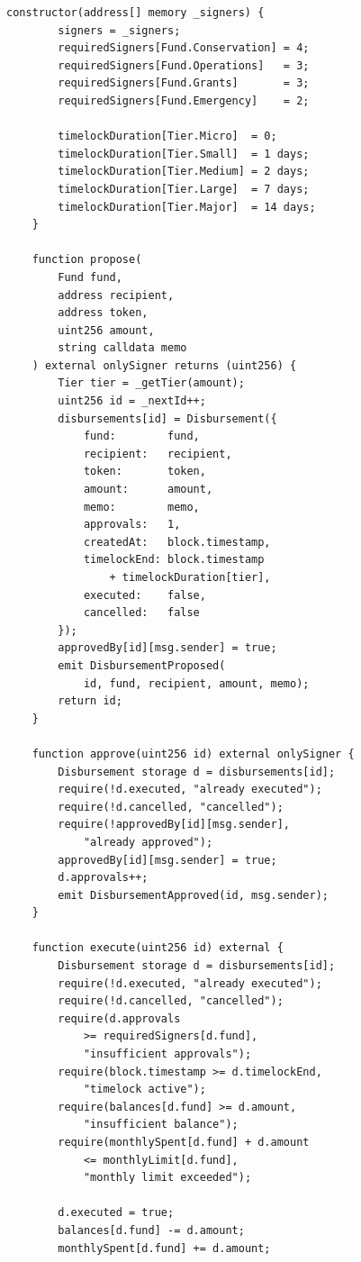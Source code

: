 \documentclass[11pt,letterpaper]{article}
\begin{document}
\begin{lstlisting}[language=Solidity,caption=TreasuryMultisig contract]
    constructor(address[] memory _signers) {
        signers = _signers;
        requiredSigners[Fund.Conservation] = 4;
        requiredSigners[Fund.Operations]   = 3;
        requiredSigners[Fund.Grants]       = 3;
        requiredSigners[Fund.Emergency]    = 2;

        timelockDuration[Tier.Micro]  = 0;
        timelockDuration[Tier.Small]  = 1 days;
        timelockDuration[Tier.Medium] = 2 days;
        timelockDuration[Tier.Large]  = 7 days;
        timelockDuration[Tier.Major]  = 14 days;
    }

    function propose(
        Fund fund,
        address recipient,
        address token,
        uint256 amount,
        string calldata memo
    ) external onlySigner returns (uint256) {
        Tier tier = _getTier(amount);
        uint256 id = _nextId++;
        disbursements[id] = Disbursement({
            fund:        fund,
            recipient:   recipient,
            token:       token,
            amount:      amount,
            memo:        memo,
            approvals:   1,
            createdAt:   block.timestamp,
            timelockEnd: block.timestamp
                + timelockDuration[tier],
            executed:    false,
            cancelled:   false
        });
        approvedBy[id][msg.sender] = true;
        emit DisbursementProposed(
            id, fund, recipient, amount, memo);
        return id;
    }

    function approve(uint256 id) external onlySigner {
        Disbursement storage d = disbursements[id];
        require(!d.executed, "already executed");
        require(!d.cancelled, "cancelled");
        require(!approvedBy[id][msg.sender],
            "already approved");
        approvedBy[id][msg.sender] = true;
        d.approvals++;
        emit DisbursementApproved(id, msg.sender);
    }

    function execute(uint256 id) external {
        Disbursement storage d = disbursements[id];
        require(!d.executed, "already executed");
        require(!d.cancelled, "cancelled");
        require(d.approvals
            >= requiredSigners[d.fund],
            "insufficient approvals");
        require(block.timestamp >= d.timelockEnd,
            "timelock active");
        require(balances[d.fund] >= d.amount,
            "insufficient balance");
        require(monthlySpent[d.fund] + d.amount
            <= monthlyLimit[d.fund],
            "monthly limit exceeded");

        d.executed = true;
        balances[d.fund] -= d.amount;
        monthlySpent[d.fund] += d.amount;


\end{lstlisting}
\end{document}
